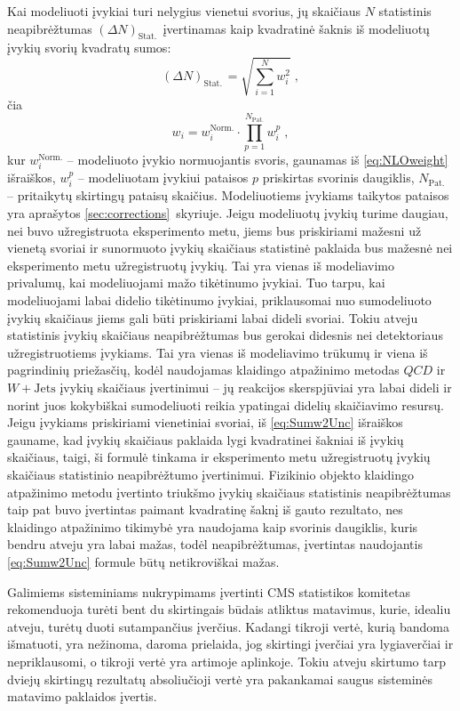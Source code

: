 \documentclass[a4paper, 12pt, oneside]{article}
\newcommand{\WJets}{W\! +\!\mathrm{Jets}}
\newcommand{\QCD}{QC\! D}
\newlength\q
\begin{document}
Kai modeliuoti įvykiai turi nelygius vienetui svorius, jų skaičiaus $N$ statistinis neapibrėžtumas $(\Delta N)_{\mathrm{Stat.\,}}$
įvertinamas kaip kvadratinė šaknis iš modeliuotų įvykių svorių kvadratų sumos:
\begin{equation}
	(\Delta N)_{\mathrm{Stat.\,}} = \sqrt{\sum_{i=1}^{N}w_{i}^{2}} \; ,
	\label{eq:Sumw2Unc}
\end{equation}
čia $$w_{i}=w_{i}^{\mathrm{Norm.}} \cdot \prod_{p=1}^{N_{\mathrm{Pat.}}}w_{i}^{p} \; ,$$
kur $w_{i}^{\mathrm{Norm.}}$ -- modeliuoto įvykio normuojantis svoris, gaunamas iš \eqref{eq:NLOweight} išraiškos,
$w_{i}^{p}$ -- modeliuotam įvykiui pataisos $p$ priskirtas svorinis daugiklis, $N_{\mathrm{Pat.}}$ -- pritaikytų
skirtingų pataisų skaičius.
Modeliuotiems įvykiams taikytos pataisos yra aprašytos \ref{sec:corrections}~skyriuje.
Jeigu modeliuotų įvykių turime daugiau, nei buvo užregistruota eksperimento metu, jiems bus priskiriami mažesni už
vienetą svoriai ir sunormuoto įvykių skaičiaus statistinė paklaida bus mažesnė nei eksperimento metu užregistruotų
įvykių.
Tai yra vienas iš modeliavimo privalumų, kai modeliuojami mažo tikėtinumo įvykiai.
Tuo tarpu, kai modeliuojami labai didelio tikėtinumo įvykiai, priklausomai nuo sumodeliuoto įvykių skaičiaus
jiems gali būti priskiriami labai dideli svoriai.
Tokiu atveju statistinis įvykių skaičiaus neapibrėžtumas bus gerokai didesnis nei detektoriaus užregistruotiems įvykiams.
Tai yra vienas iš modeliavimo trūkumų ir viena iš pagrindinių priežasčių, kodėl naudojamas klaidingo atpažinimo metodas
$\QCD$ ir $\WJets$ įvykių skaičiaus įvertinimui -- jų reakcijos skerspjūviai yra labai dideli ir norint juos kokybiškai
sumodeliuoti reikia ypatingai didelių skaičiavimo resursų.
Jeigu įvykiams priskiriami vienetiniai svoriai, iš \eqref{eq:Sumw2Unc} išraiškos gauname, kad įvykių
skaičiaus paklaida lygi kvadratinei šakniai iš įvykių skaičiaus, taigi, ši formulė tinkama ir eksperimento
metu užregistruotų įvykių skaičiaus statistinio neapibrėžtumo įvertinimui.
Fizikinio objekto klaidingo atpažinimo metodu įvertinto triukšmo įvykių skaičiaus statistinis neapibrėžtumas taip
pat buvo įvertintas paimant kvadratinę šaknį iš gauto rezultato, nes klaidingo atpažinimo tikimybė yra naudojama
kaip svorinis daugiklis, kuris bendru atveju yra labai mažas, todėl neapibrėžtumas, įvertintas naudojantis
\ref{eq:Sumw2Unc} formule būtų netikroviškai mažas.

Galimiems sisteminiams nukrypimams įvertinti CMS statistikos komitetas rekomenduoja turėti bent du skirtingais būdais
atliktus matavimus, kurie, idealiu atveju, turėtų duoti sutampančius įverčius.
Kadangi tikroji vertė, kurią bandoma išmatuoti, yra nežinoma, daroma prielaida, jog skirtingi įverčiai yra
lygiaverčiai ir nepriklausomi, o tikroji vertė yra artimoje aplinkoje.
Tokiu atveju skirtumo tarp dviejų skirtingų rezultatų absoliučioji vertė yra pakankamai saugus sisteminės matavimo
paklaidos įvertis.
\end{document}
